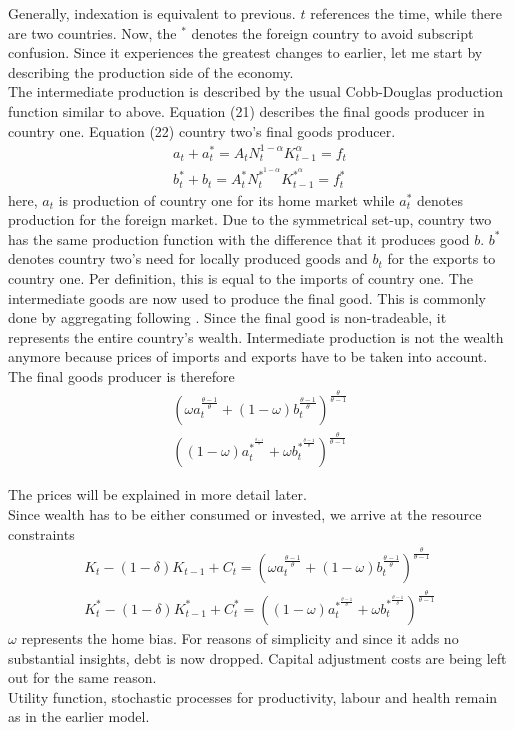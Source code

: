 \documentclass{article}
\begin{document}
Generally, indexation is equivalent to previous. $t$ references the time, while there are two countries. Now, the $^{*}$ denotes the foreign country to avoid subscript confusion. Since it experiences the greatest changes to earlier, let me start by describing the production side of the economy.\\
The intermediate production is described by the usual Cobb-Douglas production function similar to above. Equation (21) describes the final goods producer in country one. Equation (22) country two's final goods producer.
\begin{align}
a_t + a_t^* = A_t N_t^{1-\alpha} K_{t-1}^{\alpha} = f_t \\
b_t^* + b_t = A_t^* N_t^{*^{ 1-\alpha}} K_{t-1}^{*^{\alpha}} = f_t^*
\end{align}
here, $a_t$ is production of country one for its home market while $a_t^*$ denotes production for the foreign market. Due to the symmetrical set-up, country two has the same production function with the difference that it produces good $b$. $b^*$ denotes country two's need for locally produced goods and $b_t$ for the exports to country one. Per definition, this is equal to the imports of country one.
The intermediate goods are now used to produce the final good. This is commonly done by aggregating following \cite{armington1969theory}. Since the final good is non-tradeable, it represents the entire country's wealth. Intermediate production is not the wealth anymore because prices of imports and exports have to be taken into account. The final goods producer is therefore
\begin{align}
(\omega a_t^{\frac{\theta -1}{\theta}} + (1-\omega) b_t^{\frac{\theta -1}{\theta}})^{\frac{\theta}{\theta-1}} \\
((1-\omega) a_t^{*^{^\frac{\theta -1}{\theta}}} + \omega b_t^{*^{\frac{\theta -1}{\theta}}})^{\frac{\theta}{\theta-1}}
\end{align}

The prices will be explained in more detail later.\\
Since wealth has to be either consumed or invested, we arrive at the resource constraints
\begin{align}
K_t - (1-\delta)K_{t-1} + C_t = (\omega a_t^{\frac{\theta-1}{\theta}} + (1-\omega) b_t^{\frac{\theta-1}{\theta}})^{\frac{\theta}{\theta-1}} \\
K_t^* - (1-\delta)K_{t-1}^* + C^*_t= ((1-\omega) a_t^{*^{\frac{\theta-1}{\theta}}} + \omega b_t^{*^{\frac{\theta-1}{\theta}}})^{\frac{\theta}{\theta-1}}
\end{align}
$\omega$ represents the home bias. For reasons of simplicity and since it adds no substantial insights, debt is now dropped. Capital adjustment costs are being left out for the same reason.\\
Utility function, stochastic processes for productivity, labour and health remain as in the earlier model.
\end{document}

